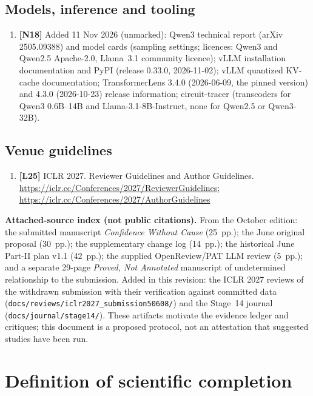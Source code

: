 \documentclass[10pt,a4paper]{article}
\begin{document}
{\subsection*{Models, inference and tooling}
\begin{enumerate}[label={},leftmargin=0pt]
\item \textbf{[N18]} Added 11 Nov 2026 (unmarked): Qwen3 technical report (arXiv 2505.09388) and model cards
(sampling settings; licences: Qwen3 and Qwen2.5 Apache-2.0, Llama~3.1 community licence); vLLM installation
documentation and PyPI (release 0.33.0, 2026-11-02); vLLM quantized KV-cache documentation; TransformerLens 3.4.0
(2026-06-09, the pinned version) and 4.3.0 (2026-10-23) release information; circuit-tracer (transcoders for
Qwen3 0.6B--14B and Llama-3.1-8B-Instruct, none for Qwen2.5 or Qwen3-32B).
\end{enumerate}

\subsection*{Venue guidelines}
\begin{enumerate}[label={},leftmargin=0pt]
\item \textbf{[L25]} ICLR 2027. Reviewer Guidelines and Author Guidelines.
\url{https://iclr.cc/Conferences/2027/ReviewerGuidelines};
\url{https://iclr.cc/Conferences/2027/AuthorGuidelines}
\end{enumerate}

\textbf{Attached-source index (not public citations).} From the October edition: the submitted manuscript
\emph{Confidence Without Cause} (25~pp.); the June original proposal (30~pp.); the supplementary change log
(14~pp.); the historical June Part-II plan v1.1 (42~pp.); the supplied OpenReview/PAT LLM review (5~pp.); and a
separate 29-page \emph{Proved, Not Annotated} manuscript of undetermined relationship to the submission. Added in
this revision: the ICLR 2027 reviews of the withdrawn submission with their verification against committed data
(\texttt{docs/reviews/iclr2027\_submission50608/}) and the Stage~14 journal (\texttt{docs/journal/stage14/}).
These artifacts motivate the evidence ledger and critiques; this document is a proposed protocol, not an
attestation that suggested studies have been run.
\par}

\section{Definition of scientific completion}
\label{sec:completion}
\end{document}
